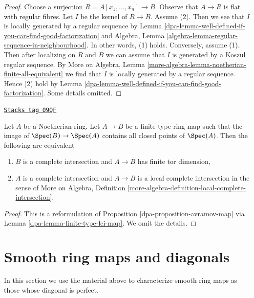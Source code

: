 \begin{proof}

Choose a surjection $R = A[x_1, \ldots, x_n] \to B$.
Observe that $A \to R$ is flat with regular fibres.
Let $I$ be the kernel of $R \to B$.
Assume (2). Then we see that
$I$ is locally generated by a regular sequence
by
Lemma \ref{dpa-lemma-well-defined-if-you-can-find-good-factorization}
and
Algebra, Lemma \ref{algebra-lemma-regular-sequence-in-neighbourhood}.
In other words, (1) holds.
Conversely, assume (1). Then after localizing on $R$ and $B$
we can assume that $I$ is generated by a Koszul regular sequence.
By More on Algebra, Lemma
\ref{more-algebra-lemma-noetherian-finite-all-equivalent}
we find that $I$ is locally generated by a regular sequence.
Hence (2) hold by
Lemma \ref{dpa-lemma-well-defined-if-you-can-find-good-factorization}.
Some details omitted.
\end{proof}

\begin{lemma}
\label{dpa-lemma-avramov-map-finite-type}
\href{https://stacks.math.columbia.edu/tag/09QF}{\texttt{Stacks tag 09QF}}

Let $A$ be a Noetherian ring. Let $A \to B$ be a finite type ring map
such that the image of $\Spec(B) \to \Spec(A)$ contains all closed
points of $\Spec(A)$. Then the following are equivalent
\begin{enumerate}
\item $B$ is a complete intersection and $A \to B$ has finite
tor dimension,
\item $A$ is a complete intersection and $A \to B$ is a local complete
intersection in the sense of More on Algebra, Definition
\ref{more-algebra-definition-local-complete-intersection}.
\end{enumerate}
\end{lemma}

\begin{proof}

This is a reformulation of Proposition \ref{dpa-proposition-avramov-map}
via Lemma \ref{dpa-lemma-finite-type-lci-map}.
We omit the details.
\end{proof}

\section{Smooth ring maps and diagonals}
\label{dpa-section-smooth-diagonal-perfect}
In this section we use the material above to characterize smooth ring maps as
those whose diagonal is perfect.

